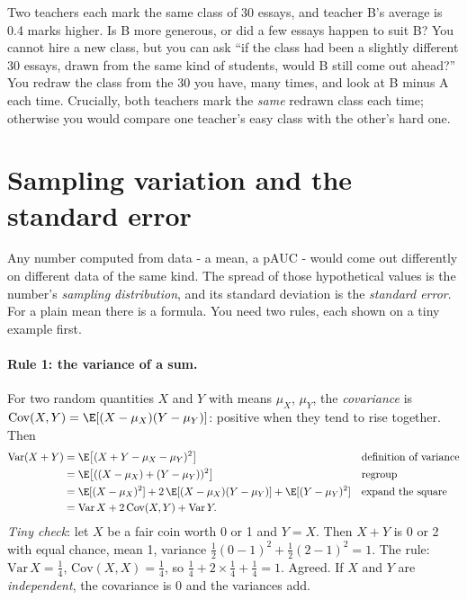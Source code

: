 \begin{analogy}
Two teachers each mark the same class of 30 essays, and teacher B's average is 0.4 marks higher. Is B more generous, or
did a few essays happen to suit B? You cannot hire a new class, but you can ask ``if the class had been a slightly
different 30 essays, drawn from the same kind of students, would B still come out ahead?'' You redraw the class from the
30 you have, many times, and look at B minus A each time. Crucially, both teachers mark the \emph{same} redrawn class
each time; otherwise you would compare one teacher's easy class with the other's hard one.
\end{analogy}

\section{Sampling variation and the standard error}\label{sec:bootstrap:se}

Any number computed from data - a mean, a pAUC - would come out differently on different data of the same kind. The
spread of those hypothetical values is the number's \emph{sampling distribution}, and its
standard deviation is the \emph{standard error}. For a plain mean there is a formula. You need two
rules, each shown on a tiny example first.

\paragraph{Rule 1: the variance of a sum.} For two random quantities $X$ and $Y$ with means $\mu_X$, $\mu_Y$, the
\emph{covariance} is $\mathrm{Cov}(X,Y) = \E[(X - \mu_X)(Y - \mu_Y)]$: positive when they tend to
rise together. Then
\begin{align*}
\mathrm{Var}(X + Y) &= \E\big[(X + Y - \mu_X - \mu_Y)^2\big] && \text{definition of variance}\\
&= \E\big[((X - \mu_X) + (Y - \mu_Y))^2\big] && \text{regroup}\\
&= \E[(X - \mu_X)^2] + 2\,\E[(X - \mu_X)(Y - \mu_Y)] + \E[(Y - \mu_Y)^2] && \text{expand the square}\\
&= \mathrm{Var}\,X + 2\,\mathrm{Cov}(X, Y) + \mathrm{Var}\,Y.
\end{align*}
\emph{Tiny check}: let $X$ be a fair coin worth 0 or 1 and $Y = X$. Then $X + Y$ is 0 or 2 with equal chance, mean 1,
variance $\frac12(0-1)^2 + \frac12(2-1)^2 = 1$. The rule: $\mathrm{Var}\,X = \frac14$, $\mathrm{Cov}(X, X) = \frac14$,
so $\frac14 + 2 \times \frac14 + \frac14 = 1$. Agreed. If $X$ and $Y$ are \emph{independent}, the covariance is 0 and
the variances add.

